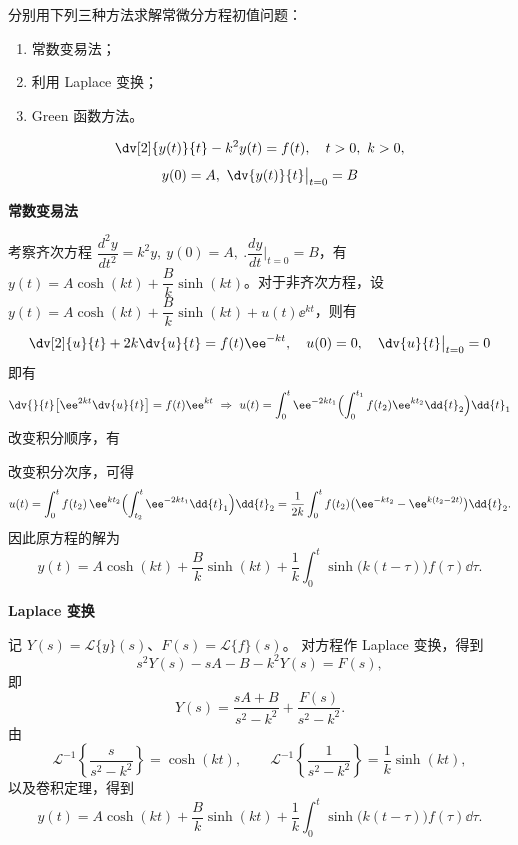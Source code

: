 \begin{question}
分别用下列三种方法求解常微分方程初值问题：
\begin{enumerate}
  \item 常数变易法；
  \item 利用 Laplace 变换；
  \item Green 函数方法。
\end{enumerate}
\[ \dv[2]{y(t)}{t} - k^2 y(t)=f(t),\quad t>0,\ k>0, \] \[ y(0)=A,\ \bigl.\dv{y(t)}{t}\bigr|_{t=0}=B \]
\begin{solution}
\textbf{常数变易法}\par

考察齐次方程 \(\dfrac{d^2y}{dt^2}=k^2 y,\ y(0)=A,\ \bigl.\dfrac{dy}{dt}\bigr|_{t=0}=B\)，有 \(y(t)=A\cosh(k t)+\dfrac{B}{k}\sinh(k t)\)。对于非齐次方程，设 \(y(t)=A\cosh(k t)+\dfrac{B}{k}\sinh(k t) + u(t) \ee^{k t}\)，则有 \[ \dv[2]{u}{t}+2k\dv{u}{t}=f(t) \ee^{-k t},\quad u(0)=0,\quad \bigl.\dv{u}{t}\bigr|_{t=0}=0 \]即有 \[ \dv{}{t}\bigl[\ee^{2k t}\dv{u}{t}\bigr]=f(t) \ee^{k t}\ \Rightarrow\ u(t)=\int_0^t \ee^{-2k t_1}\Bigl(\int_0^{t_1} f(t_2) \ee^{k t_2}\dd{t}_2\Bigr)\dd{t}_1 \]改变积分顺序，有
\begin{center}
\end{center}

改变积分次序，可得
\[
u(t) = \int_0^t f(t_2)\,\ee^{k t_2}\Bigl(\int_{t_2}^t \ee^{-2k t_1}\dd{t}_1\Bigr)\dd{t}_2
= \frac{1}{2k}\int_0^t f(t_2)\bigl(\ee^{-k t_2}-\ee^{k(t_2-2t)}\bigr)\dd{t}_2.
\]
因此原方程的解为
\[
y(t)=A\cosh(kt)+\frac{B}{k}\sinh(kt)
+\frac1k\int_0^t\sinh\bigl(k(t-\tau)\bigr)f(\tau)\dd{\tau}.
\]

\textbf{Laplace 变换}\par

记 \(Y(s)=\mathcal{L}\{y\}(s)\)、\(F(s)=\mathcal{L}\{f\}(s)\)。
对方程作 Laplace 变换，得到
\[
s^2Y(s)-sA-B-k^2Y(s)=F(s),
\]
即
\[
Y(s)=\frac{sA+B}{s^2-k^2}+\frac{F(s)}{s^2-k^2}.
\]
由
\[
\mathcal{L}^{-1}\!\left\{\frac{s}{s^2-k^2}\right\}=\cosh(kt),
\qquad
\mathcal{L}^{-1}\!\left\{\frac{1}{s^2-k^2}\right\}
=\frac1k\sinh(kt),
\]
以及卷积定理，得到
\[
y(t)=A\cosh(kt)+\frac{B}{k}\sinh(kt)
+\frac1k\int_0^t\sinh\bigl(k(t-\tau)\bigr)f(\tau)\dd{\tau}.
\]


\end{solution}
\end{question}
